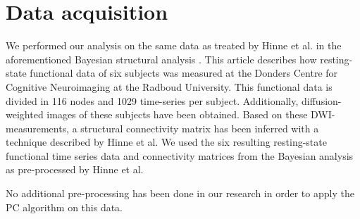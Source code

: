 \documentclass[a4paper, 10pt, english, onecolumn]{article}
\begin{document}
\section{Data acquisition}\label{sec:data}
We performed our analysis on the same data as treated by Hinne et al. in the aforementioned Bayesian structural analysis \cite{hinne2013, hinne2013structfunc}.
This article describes how resting-state functional data of six subjects was measured at the Donders Centre for Cognitive Neuroimaging at the Radboud University.
This functional data is divided in 116 nodes and 1029 time-series per subject.
Additionally, diffusion-weighted images of these subjects have been obtained.
Based on these DWI-measurements, a structural connectivity matrix has been inferred with a technique described by Hinne et al.
We used the six resulting resting-state functional time series data and connectivity matrices from the Bayesian analysis as pre-processed by Hinne et al.

No additional pre-processing has been done in our research in order to apply the PC algorithm on this data.
\end{document}
